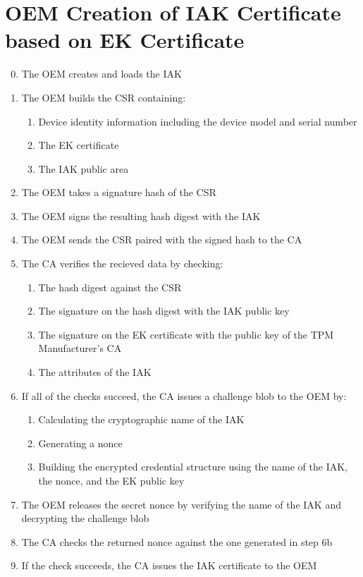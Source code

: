\newpage
\section{OEM Creation of IAK Certificate based on EK Certificate}

\begin{enumerate}[itemsep=0pt,parsep=0pt,partopsep=0pt]
  \setcounter{enumi}{-1}
  \item The OEM creates and loads the IAK
  \item The OEM builds the CSR containing:
  \begin{enumerate}[topsep=0pt, itemsep=0pt,parsep=0pt,partopsep=0pt]
    \item Device identity information including the device model and serial
    number
    \item The EK certificate
    \item The IAK public area
  \end{enumerate}
  \item The OEM takes a signature hash of the CSR
  \item The OEM signs the resulting hash digest with the IAK
  \item The OEM sends the CSR paired with the signed hash to the CA
  \item The CA verifies the recieved data by checking:
  \begin{enumerate}[topsep=0pt, itemsep=0pt,parsep=0pt,partopsep=0pt]
    \item The hash digest against the CSR
    \item The signature on the hash digest with the IAK public key
    \item The signature on the EK certificate with the public key of the TPM Manufacturer's CA
    \item The attributes of the IAK
  \end{enumerate}
  \item If all of the checks succeed, the CA issues a challenge blob to the OEM by:
  \begin{enumerate}[topsep=0pt, itemsep=0pt,parsep=0pt,partopsep=0pt]
    \item Calculating the cryptographic name of the IAK
    \item Generating a nonce
    \item Building the encrypted credential structure using the name of the IAK, the nonce, and the EK public key
  \end{enumerate}
  \item The OEM releases the secret nonce by verifying the name of the IAK and decrypting the challenge blob
  \item The CA checks the returned nonce against the one generated in step 6b
  \item If the check succeeds, the CA issues the IAK certificate to the OEM
\end{enumerate}

